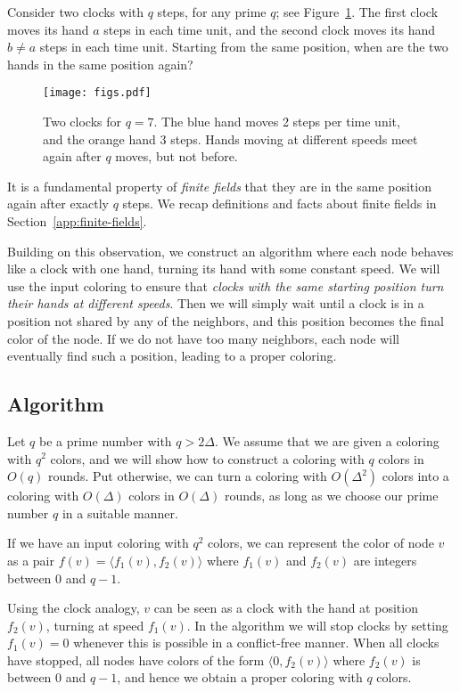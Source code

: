Consider two clocks with $q$ steps, for any prime $q$; see Figure~\ref{fig:clocks}. The first clock moves its hand $a$ steps in each time unit, and the second clock moves its hand $b \neq a$ steps in each time unit. Starting from the same position, when are the two hands in the same position again?

\begin{figure}
    \centering
    \texttt{[image: figs.pdf]}
    \caption{Two clocks for $q=7$. The blue hand moves 2 steps per time unit, and the orange hand 3 steps. Hands moving at different speeds meet again after $q$ moves, but not before.}\label{fig:clocks}
\end{figure}

It is a fundamental property of \emph{finite fields} that they are in the same position again after exactly $q$ steps. We recap definitions and facts about finite fields in Section~\ref{app:finite-fields}.

Building on this observation, we construct an algorithm where each node behaves like a clock with one hand, turning its hand with some constant speed. We will use the input coloring to ensure that \emph{clocks with the same starting position turn their hands at different speeds}. Then we will simply wait until a clock is in a position not shared by any of the neighbors, and this position becomes the final color of the node. If we do not have too many neighbors, each node will eventually find such a position, leading to a proper coloring.

\subsection{Algorithm}\label{sec:additive-group-col-alg}

Let $q$ be a prime number with $q > 2\Delta$. We assume that we are given a coloring with $q^2$ colors, and we will show how to construct a coloring with $q$ colors in $O(q)$ rounds. Put otherwise, we can turn a coloring with $O(\Delta^2)$ colors into a coloring with $O(\Delta)$ colors in $O(\Delta)$ rounds, as long as we choose our prime number $q$ in a suitable manner.

If we have an input coloring with $q^2$ colors, we can represent the color of node $v$ as a pair $f(v) = \langle f_1(v), f_2(v) \rangle$ where $f_1(v)$ and $f_2(v)$ are integers between $0$ and $q-1$.

Using the clock analogy, $v$ can be seen as a clock with the hand at position $f_2(v)$, turning at speed $f_1(v)$. In the algorithm we will stop clocks by setting $f_1(v) = 0$ whenever this is possible in a conflict-free manner. When all clocks have stopped, all nodes have colors of the form $\langle 0, f_2(v) \rangle$ where $f_2(v)$ is between $0$ and $q-1$, and hence we obtain a proper coloring with $q$ colors.

